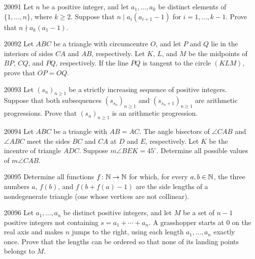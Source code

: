 
\begin{problem}{2009}{1}
Let $n$ be a positive integer, and let $a_1, \dots, a_k$ be distinct elements of $\{1, \dots, n\}$, where $k\geq2$. Suppose that $n\mid a_i(a_{i+1}-1)$ for $i=1, \dots, k-1$. Prove that $n\nmid a_k(a_1-1)$.
\end{problem}

\begin{problem}{2009}{2}
Let $ABC$ be a triangle with circumcentre $O$, and let $P$ and $Q$ lie in the interiors of sides $CA$ and $AB$, respectively. Let $K$, $L$, and $M$ be the midpoints of $BP$, $CQ$, and $PQ$, respectively. If the line $PQ$ is tangent to the circle $(KLM)$, prove that $OP=OQ$.
\end{problem}

\begin{problem}{2009}{3}
Let $(s_n)_{n\geq1}$ be a strictly increasing sequence of positive integers. Suppose that both subsequences $(s_{s_n})_{n\geq1}$ and $(s_{s_n+1})_{n\geq1}$ are arithmetic progressions. Prove that $(s_n)_{n\geq1}$ is an arithmetic progression.
\end{problem}

\begin{problem}{2009}{4}
Let $ABC$ be a triangle with $AB=AC$. The angle bisectors of $\angle CAB$ and $\angle ABC$ meet the sides $BC$ and $CA$ at $D$ and $E$, respectively. Let $K$ be the incentre of triangle $ADC$. Suppose $m\angle BEK=45^\circ$. Determine all possible values of $m\angle CAB$.
\end{problem}

\begin{problem}{2009}{5}
Determine all functions $f\colon\mathbb{N}\to\mathbb{N}$ for which, for every $a, b\in\mathbb{N}$, the three numbers $a$, $f(b)$, and $f(b+f(a)-1)$ are the side lengths of a nondegenerate triangle (one whose vertices are not collinear).
\end{problem}

\begin{problem}{2009}{6}
Let $a_1, \dots, a_n$ be distinct positive integers, and let $M$ be a set of $n-1$ positive integers not containing $s=a_1+\cdots+a_n$. A grasshopper starts at $0$ on the real axis and makes $n$ jumps to the right, using each length $a_1, \dots, a_n$ exactly once. Prove that the lengths can be ordered so that none of its landing points belongs to $M$.
\end{problem}
